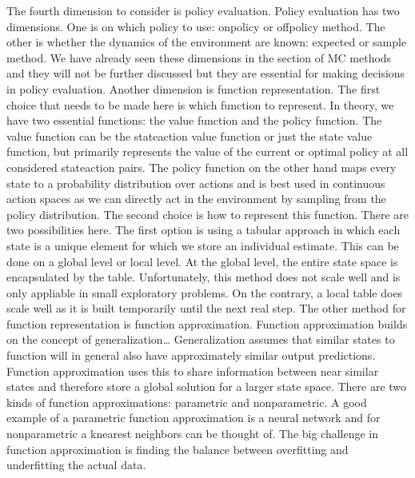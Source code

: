 \documentclass[letterpaper,10pt,english]{jupyterBook}
\begin{document}
\sphinxAtStartPar
The fourth dimension to consider is policy evaluation. Policy evaluation has two dimensions. One is on which policy to use: on\sphinxhyphen{}policy or off\sphinxhyphen{}policy method. The other is whether the dynamics of the environment are known: expected or sample method. We have already seen these dimensions in the section of MC methods and they will not be further discussed but they are essential for making decisions in policy evaluation. Another dimension is function representation. The first choice that needs to be made here is which function to represent. In theory, we have two essential functions: the value function and the policy function. The value function can be the state\sphinxhyphen{}action value function or just the state value function, but primarily represents the value of the current or optimal policy at all considered state\sphinxhyphen{}action pairs. The policy function on the other hand maps every state to a probability distribution over actions and is best used in continuous action spaces as we can directly act in the environment by sampling from the policy distribution. The second choice is how to represent this function. There are two possibilities here. The first option is using a tabular approach in which each state is a unique element for which we store an individual estimate.  This can be done on a global level or local level. At the global level, the entire state space is encapsulated by the table. Unfortunately, this method does not scale well and is only appliable in small exploratory problems. On the contrary, a local table does scale well as it is built temporarily until the next real step. The other method for function representation is function approximation. Function approximation builds on the concept of generalization… Generalization assumes that similar states to function will in general also have approximately similar output predictions. Function approximation uses this to share information between near similar states and therefore store a global solution for a larger state space. There are two kinds of function approximations: parametric and non\sphinxhyphen{}parametric. A good example of a parametric function approximation is a neural network and for non\sphinxhyphen{}parametric a k\sphinxhyphen{}nearest neighbors can be thought of. The big challenge in function approximation is finding the balance between overfitting and underfitting the actual data.
\end{document}
